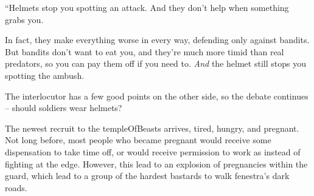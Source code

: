 \begin{multicols}{2}
\begin{exampletext}
  \begin{speechtext}
    ``Helmets stop you spotting an attack.
    And they don't help when something grabs you.

    In fact, they make everything worse in every way, defending only against bandits.
    But bandits don't want to eat you, and they're much more timid than real predators, so you can pay them off if you need to.
    \emph{And} the helmet still stops you spotting the ambush.
  \end{speechtext}

  The interlocutor has a few good points on the other side, so the debate continues -- should soldiers wear helmets?
\end{exampletext}

\begin{exampletext}
  The newest recruit to the \gls{templeOfBeasts} arrives, tired, hungry, and pregnant.
  Not long before, most people who became pregnant would receive some dispensation to take time off, or would receive permission to work as  instead of fighting at the \gls{edge}.
  However, this lead to an explosion of pregnancies within the \gls{guard}, which lead to a group of the hardest bastards to walk \gls{fenestra}'s dark roads.
\end{exampletext}

\end{multicols}
